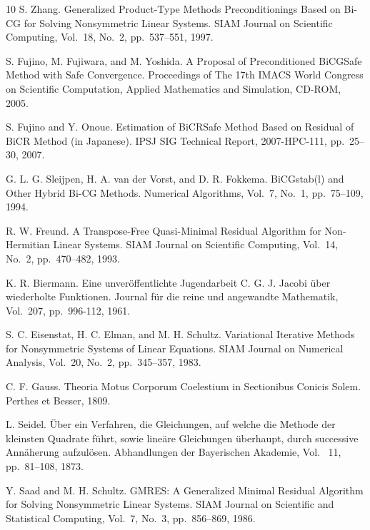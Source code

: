 \documentclass[a4paper]{article}
\begin{document}
\begin{thebibliography}{10}
S. Zhang.
\newblock Generalized Product-Type Methods Preconditionings Based on
	Bi-CG for Solving Nonsymmetric Linear Systems.
\newblock SIAM Journal on Scientific Computing, Vol.~18, No.~2, pp.\ 537--551, 1997. 

S. Fujino, M. Fujiwara, and M. Yoshida.
\newblock A Proposal of Preconditioned BiCGSafe Method with Safe Convergence.
\newblock Proceedings of The 17th IMACS World Congress on Scientific
	Computation, Applied Mathematics and Simulation, CD-ROM, 2005.

S. Fujino and Y. Onoue.
\newblock Estimation of BiCRSafe Method Based on Residual of BiCR Method (in Japanese).
\newblock IPSJ SIG Technical Report, 2007-HPC-111, pp.\ 25--30, 2007.

G. L. G. Sleijpen, H. A. van der Vorst, and D. R. Fokkema.
\newblock BiCGstab(l) and Other Hybrid Bi-CG Methods.
\newblock Numerical Algorithms, Vol.~7, No.~1, pp.\ 75--109, 1994.

R. W. Freund.
\newblock A Transpose-Free Quasi-Minimal Residual Algorithm for
	Non-Hermitian Linear Systems.
\newblock SIAM Journal on Scientific Computing, Vol.~14, No.~2, pp.\ 470--482, 1993.

K. R. Biermann.
\newblock Eine unver\"offentlichte Jugendarbeit C. G. J. Jacobi \"uber
	wiederholte Funktionen.
\newblock Journal f\"ur die reine und angewandte Mathematik, Vol.~207, pp.\ 996-112, 1961.

S. C. Eisenstat, H. C. Elman, and M. H. Schultz.
\newblock Variational Iterative Methods for Nonsymmetric Systems of
	Linear Equations.
\newblock SIAM Journal on Numerical Analysis, Vol.~20, No.~2, pp.\ 345--357, 1983.

C. F. Gauss.
\newblock Theoria Motus Corporum Coelestium in Sectionibus Conicis Solem. 
\newblock Perthes et Besser, 1809.

L. Seidel.
\newblock \"Uber ein Verfahren, die Gleichungen, auf welche die Methode
	der kleinsten Quadrate f\"uhrt, sowie line\"are Gleichungen
	\"uberhaupt, durch successive Ann\"aherung  aufzul\"osen.
\newblock Abhandlungen der Bayerischen Akademie, Vol. ~11, pp.\ 81--108,
	1873.

Y. Saad and M. H. Schultz.
\newblock GMRES: A Generalized Minimal Residual Algorithm for Solving
	Nonsymmetric Linear Systems.
\newblock SIAM Journal on Scientific and Statistical Computing, Vol.~7, No.~3, pp.\ 856--869, 1986.


\end{thebibliography}
\end{document}
